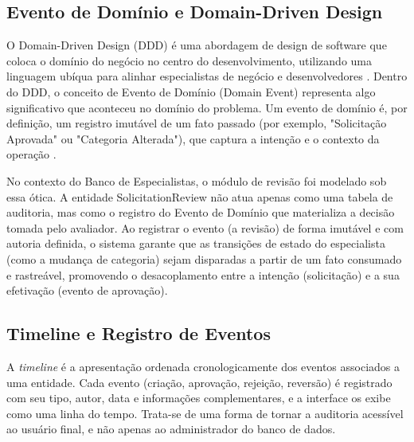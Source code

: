 
\subsection{Evento de Domínio e Domain-Driven Design}
\label{subsec:evento-dominio-ddd}
O Domain-Driven Design (DDD) é uma abordagem de design de software que coloca o domínio do
negócio no centro do desenvolvimento, utilizando uma linguagem ubíqua para alinhar especialistas
de negócio e desenvolvedores \cite{evans2003}. Dentro do DDD, o conceito de Evento de Domínio
(Domain Event) representa algo significativo que aconteceu no domínio do problema. Um evento de
domínio é, por definição, um registro imutável de um fato passado (por exemplo, "Solicitação
Aprovada" ou "Categoria Alterada"), que captura a intenção e o contexto da operação
\cite{evans2003}.

No contexto do Banco de Especialistas, o módulo de revisão foi modelado sob essa ótica. A
entidade SolicitationReview não atua apenas como uma tabela de auditoria, mas como o registro do
Evento de Domínio que materializa a decisão tomada pelo avaliador. Ao registrar o evento (a
revisão) de forma imutável e com autoria definida, o sistema garante que as transições de estado
do especialista (como a mudança de categoria) sejam disparadas a partir de um fato consumado e
rastreável, promovendo o desacoplamento entre a intenção (solicitação) e a sua efetivação
(evento de aprovação).

\subsection{Timeline e Registro de Eventos}
\label{subsec:timeline-registro-eventos}

A \textit{timeline} é a apresentação ordenada cronologicamente dos eventos associados a uma
entidade. Cada evento (criação, aprovação, rejeição, reversão) é registrado com seu tipo,
autor, data e informações complementares, e a interface os exibe como uma linha do tempo.
Trata-se de uma forma de tornar a auditoria acessível ao usuário final, e não apenas ao
administrador do banco de dados.

